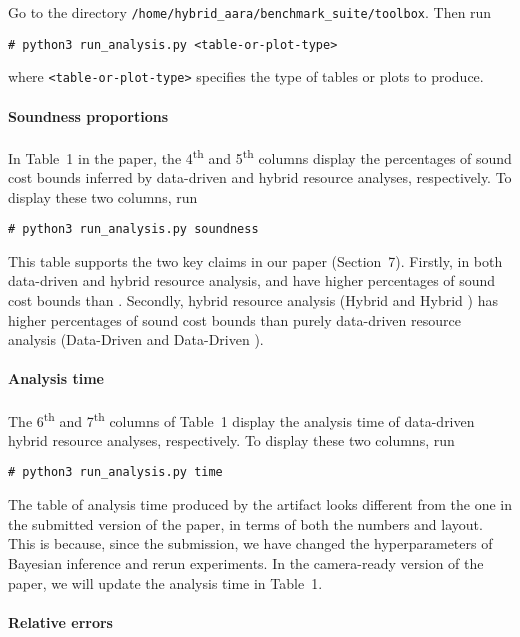 Go to the directory \texttt{/home/hybrid\_aara/benchmark\_suite/toolbox}.
%
Then run
\begin{verbatim}
# python3 run_analysis.py <table-or-plot-type>
\end{verbatim}
where \texttt{<table-or-plot-type>} specifies the type of tables or plots to
produce.

\paragraph{Soundness proportions}

In Table~1 in the paper, the 4\textsuperscript{th} and 5\textsuperscript{th}
columns display the percentages of sound cost bounds inferred by data-driven and
hybrid resource analyses, respectively.
%
To display these two columns, run
\begin{verbatim}
# python3 run_analysis.py soundness
\end{verbatim}

This table supports the two key claims in our paper (Section~7).
%
Firstly, in both data-driven and hybrid resource analysis, \BayesWC{} and
\BayesPC{} have higher percentages of sound cost bounds than \Opt{}.
%
Secondly, hybrid resource analysis (Hybrid \BayesWC{} and Hybrid \BayesPC{}) has
higher percentages of sound cost bounds than purely data-driven resource
analysis (Data-Driven \BayesWC{} and Data-Driven \BayesPC{}).

\paragraph{Analysis time}

The 6\textsuperscript{th} and 7\textsuperscript{th} columns of Table~1 display
the analysis time of data-driven hybrid resource analyses, respectively.
To display these two columns, run
\begin{verbatim}
# python3 run_analysis.py time
\end{verbatim}

The table of analysis time produced by the artifact looks different from the one
in the submitted version of the paper, in terms of both the numbers and layout.
%
This is because, since the submission, we have changed the hyperparameters of
Bayesian inference and rerun experiments.
%
In the camera-ready version of the paper, we will update the analysis time in
Table~1.

\paragraph{Relative errors}

